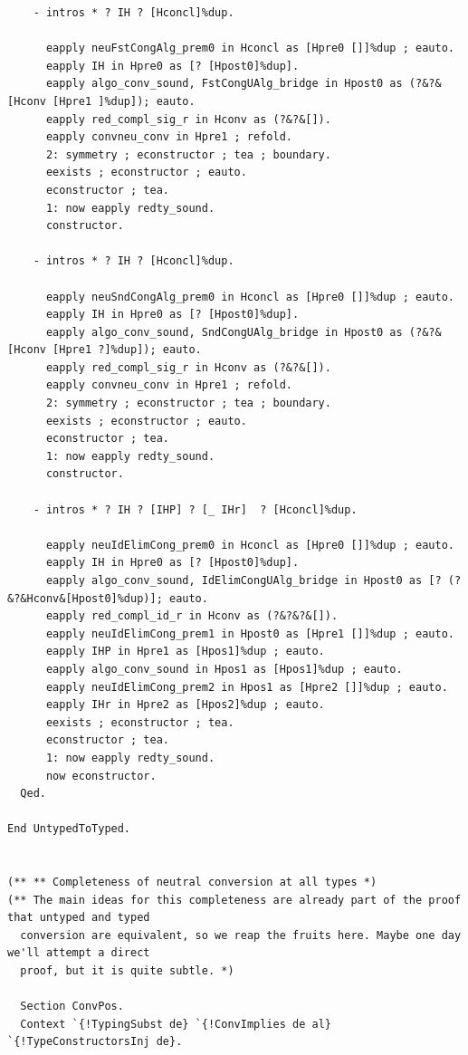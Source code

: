 \documentclass[10pt,a4paper]{amsart}
\begin{document}
\begin{lstlisting}
    - intros * ? IH ? [Hconcl]%dup.

      eapply neuFstCongAlg_prem0 in Hconcl as [Hpre0 []]%dup ; eauto.
      eapply IH in Hpre0 as [? [Hpost0]%dup].
      eapply algo_conv_sound, FstCongUAlg_bridge in Hpost0 as (?&?&[Hconv [Hpre1 ]%dup]); eauto.
      eapply red_compl_sig_r in Hconv as (?&?&[]).
      eapply convneu_conv in Hpre1 ; refold.
      2: symmetry ; econstructor ; tea ; boundary.
      eexists ; econstructor ; eauto.
      econstructor ; tea.
      1: now eapply redty_sound.
      constructor.
      
    - intros * ? IH ? [Hconcl]%dup.

      eapply neuSndCongAlg_prem0 in Hconcl as [Hpre0 []]%dup ; eauto.
      eapply IH in Hpre0 as [? [Hpost0]%dup].
      eapply algo_conv_sound, SndCongUAlg_bridge in Hpost0 as (?&?&[Hconv [Hpre1 ?]%dup]); eauto.
      eapply red_compl_sig_r in Hconv as (?&?&[]).
      eapply convneu_conv in Hpre1 ; refold.
      2: symmetry ; econstructor ; tea ; boundary.
      eexists ; econstructor ; eauto.
      econstructor ; tea.
      1: now eapply redty_sound.
      constructor.

    - intros * ? IH ? [IHP] ? [_ IHr]  ? [Hconcl]%dup.

      eapply neuIdElimCong_prem0 in Hconcl as [Hpre0 []]%dup ; eauto.
      eapply IH in Hpre0 as [? [Hpost0]%dup].
      eapply algo_conv_sound, IdElimCongUAlg_bridge in Hpost0 as [? (?&?&Hconv&[Hpost0]%dup)]; eauto.
      eapply red_compl_id_r in Hconv as (?&?&?&[]).
      eapply neuIdElimCong_prem1 in Hpost0 as [Hpre1 []]%dup ; eauto.
      eapply IHP in Hpre1 as [Hpos1]%dup ; eauto.
      eapply algo_conv_sound in Hpos1 as [Hpos1]%dup ; eauto.
      eapply neuIdElimCong_prem2 in Hpos1 as [Hpre2 []]%dup ; eauto.
      eapply IHr in Hpre2 as [Hpos2]%dup ; eauto.
      eexists ; econstructor ; tea.
      econstructor ; tea.
      1: now eapply redty_sound.
      now econstructor.
  Qed.

End UntypedToTyped.


(** ** Completeness of neutral conversion at all types *)
(** The main ideas for this completeness are already part of the proof that untyped and typed
  conversion are equivalent, so we reap the fruits here. Maybe one day we'll attempt a direct
  proof, but it is quite subtle. *)

  Section ConvPos.
  Context `{!TypingSubst de} `{!ConvImplies de al} `{!TypeConstructorsInj de}.


\end{lstlisting}
\end{document}
